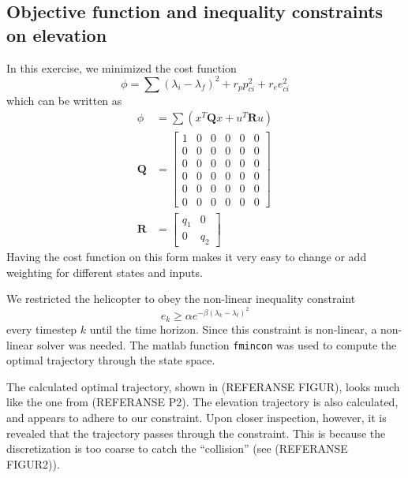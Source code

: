 \subsection{Objective function and inequality constraints on elevation}
In this exercise, we minimized the cost function
\begin{equation}
        \phi =\sum (\lambda_i - \lambda_f)^2 + r_{p}p_{ci}^2 + r_{e}e_{ci}^2
\end{equation}
which can be written as
\begin{subequations}
    \begin{align}
        \phi &= \sum(x^{T}\mathbf{Q}x+u^{T}\mathbf{R}u) \\
        \mathbf{Q} &= \begin{bmatrix}
        1 & 0 & 0 & 0 & 0 & 0         \\
        0 & 0 & 0 & 0 & 0 & 0         \\
        0 & 0 & 0 & 0 & 0 & 0         \\
        0 & 0 & 0 & 0 & 0 & 0         \\
        0 & 0 & 0 & 0 & 0 & 0         \\
        0 & 0 & 0 & 0 & 0 & 0
        \end{bmatrix}\\
        \mathbf{R} &= \begin{bmatrix}
            q_1        & 0        \\
            0          & q_2
        \end{bmatrix}
    \end{align}
\end{subequations}
Having the cost function on this form makes it very easy to change or add weighting for different states and inputs.

We restricted the helicopter to obey the non-linear inequality constraint
\begin{equation}
e_k \geq \alpha e^{-\beta(\lambda_k-\lambda_t)^{2}}
\end{equation}
every timestep $k$ until the time horizon.
Since this constraint is non-linear, a non-linear solver was needed. The matlab function \texttt{fmincon} was used to compute the optimal trajectory through the state space.



The calculated optimal trajectory, shown in (REFERANSE FIGUR), looks much like the one from (REFERANSE P2). The elevation trajectory is also calculated, and appears to adhere to our constraint. Upon closer inspection, however, it is revealed that the trajectory passes through the constraint. This is because the discretization is too coarse to catch the ``collision'' (see (REFERANSE FIGUR2)).

